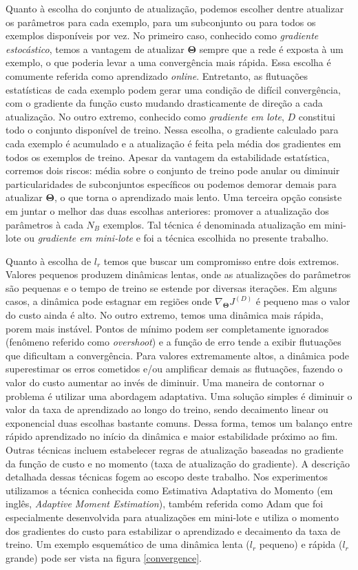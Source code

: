 Quanto à escolha do conjunto de atualização, podemos escolher dentre atualizar os parâmetros para cada exemplo, para um subconjunto ou para todos os exemplos disponíveis por vez. No primeiro caso, conhecido como \textit{gradiente estocástico}, temos a vantagem de atualizar $\mathbf{\Theta}$ sempre que a rede é exposta à um exemplo, o que poderia levar a uma convergência mais rápida. Essa escolha é comumente referida como aprendizado \textit{online}. Entretanto, as flutuações estatísticas de cada exemplo podem gerar uma condição de difícil convergência, com o gradiente da função custo mudando drasticamente de direção a cada atualização. No outro extremo, conhecido como \textit{gradiente em lote}, $D$ constitui todo o conjunto disponível de treino. Nessa escolha, o gradiente calculado para cada exemplo é acumulado e a atualização é feita pela média dos gradientes em todos os exemplos de treino. Apesar da vantagem da estabilidade estatística, corremos dois riscos: média sobre o conjunto de treino pode anular ou diminuir particularidades de subconjuntos específicos ou podemos demorar demais para atualizar $\mathbf{\Theta}$, o que torna o aprendizado mais lento. Uma terceira opção consiste em juntar o melhor das duas escolhas anteriores: promover a atualização dos parâmetros à cada $N_B$ exemplos. Tal técnica é denominada atualização em mini-lote ou \textit{gradiente em mini-lote} e foi a técnica escolhida no presente trabalho.  

Quanto à escolha de $l_r$ temos que buscar um compromisso entre dois extremos. Valores pequenos produzem dinâmicas lentas, onde as atualizações do parâmetros são pequenas e o tempo de treino se estende por diversas iterações. Em alguns casos, a dinâmica pode estagnar em regiões onde $\nabla_{\mathbf{\Theta}} J^{(D)}$ é pequeno mas o valor do custo ainda é alto. No outro extremo, temos uma dinâmica mais rápida, porem mais instável. Pontos de mínimo podem ser completamente ignorados (fenômeno referido como \textit{overshoot}) e a função de erro tende a exibir flutuações que dificultam a convergência. Para valores extremamente altos, a dinâmica pode superestimar os erros cometidos e/ou amplificar demais as flutuações, fazendo o valor do custo aumentar ao invés de diminuir. Uma maneira de contornar o problema é utilizar uma abordagem adaptativa. Uma solução simples é diminuir o valor da taxa de aprendizado ao longo do treino, sendo decaimento linear ou exponencial duas escolhas bastante comuns. Dessa forma, temos um balanço entre rápido aprendizado no início da dinâmica e maior estabilidade próximo ao fim. Outras técnicas incluem estabelecer regras de atualização baseadas no gradiente da função de custo e no momento (taxa de atualização do gradiente). A descrição detalhada dessas técnicas fogem ao escopo deste trabalho. Nos experimentos utilizamos a técnica conhecida como Estimativa Adaptativa do Momento (em inglês, \textit{Adaptive Moment Estimation}), também referida como Adam \cite{adam_op} que foi especialmente desenvolvida para atualizações em mini-lote e utiliza o momento dos gradientes do custo para estabilizar o aprendizado e decaimento da taxa de treino. Um exemplo esquemático de uma dinâmica lenta ($l_r$ pequeno) e rápida ($l_r$ grande) pode ser vista na figura \ref{convergence}.

